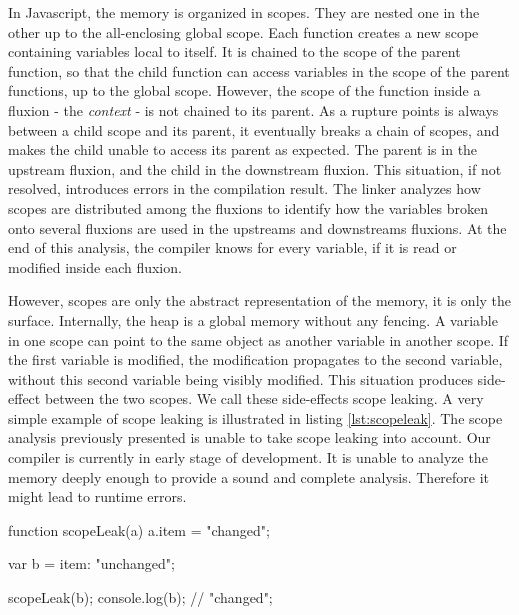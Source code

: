 In Javascript, the memory is organized in scopes.
They are nested one in the other up to the all-enclosing global scope.
Each function creates a new scope containing variables local to itself.
It is chained to the scope of the parent function, so that the child function can access variables in the scope of the parent functions, up to the global scope.
However, the scope of the function inside a fluxion - the \textit{context} - is not chained to its parent.
As a rupture points is always between a child scope and its parent, it eventually breaks a chain of scopes, and makes the child unable to access its parent as expected.
The parent is in the upstream fluxion, and the child in the downstream fluxion.
This situation, if not resolved, introduces errors in the compilation result.
The linker analyzes how scopes are distributed among the fluxions to identify how the variables broken onto several fluxions are used in the upstreams and downstreams fluxions.
At the end of this analysis, the compiler knows for every variable, if it is read or modified inside each fluxion.

However, scopes are only the abstract representation of the memory, it is only the surface.
Internally, the heap is a global memory without any fencing.
A variable in one scope can point to the same object as another variable in another scope.
If the first variable is modified, the modification propagates to the second variable, without this second variable being visibly modified.
This situation produces side-effect between the two scopes.
We call these side-effects scope leaking.
A very simple example of scope leaking is illustrated in listing \ref{lst:scopeleak}.
The scope analysis previously presented is unable to take scope leaking into account.
Our compiler is currently in early stage of development.
It is unable to analyze the memory deeply enough to provide a sound and complete analysis.
Therefore it might lead to runtime errors.

\begin{code}[js, caption={Example of a simple scope leak},label={lst:scopeleak}]
function scopeLeak(a)
{
  a.item = "changed";
}

var b = {item: "unchanged"};

scopeLeak(b);
console.log(b); // "changed";
\end{code}

